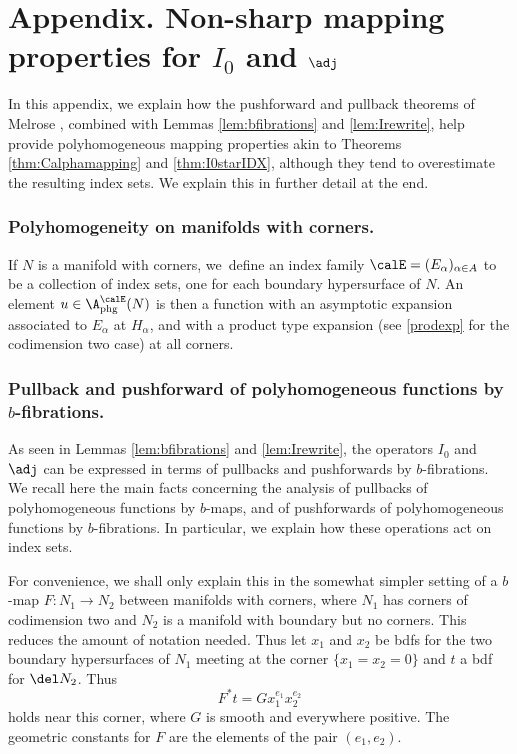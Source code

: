 \appendix

\section*{Appendix. Non-sharp mapping properties for \texorpdfstring{$I_0$ and $\adj$}{adj}}\label{sec:PFT}

In this appendix, we explain how the pushforward and pullback theorems of Melrose \cite{Melrose1992}, combined with Lemmas \ref{lem:bfibrations} and \ref{lem:Irewrite}, help provide polyhomogeneous mapping properties akin to Theorems \ref{thm:Calphamapping} and \ref{thm:I0starIDX}, although they tend to overestimate the resulting index sets. We explain this in further detail at the end.

\subsubsection*{Polyhomogeneity on manifolds with corners.} If $N$ is a manifold with corners, we~defi\-ne an index family $\calE = (E_\alpha)_{\alpha \in A}$ to be a collection of index sets, one for each boundary hypersurface of $N$. An element $u \in \A^{\calE}_{\mathrm{phg}}(N)$ is then a function with an asymptotic expansion associated to $E_\alpha$ at $H_\alpha$, and with a product type expansion (see \eqref{prodexp} for the codimension two case) at all corners.

\subsubsection*{Pullback and pushforward of polyhomogeneous functions by $b$-fibrations.} As seen in Lemmas \ref{lem:bfibrations} and \ref{lem:Irewrite}, the operators $I_0$ and $\adj$ can be expressed in terms of pullbacks and pushforwards by $b$-fibrations. We recall here the main facts concerning the analysis of pullbacks of polyhomogeneous functions by $b$-maps, and of pushforwards of polyhomogeneous functions by $b$-fibrations. In particular, we explain how these operations act on index sets.

For convenience, we shall only explain this in the somewhat simpler setting of a $b$-map $F\colon N_1 \to N_2$ between manifolds with corners, where $N_1$ has corners of codimension two and $N_2$ is a manifold with boundary but no corners. This reduces the amount of notation needed. Thus let $x_1$ and $x_2$ be bdfs for the two boundary hypersurfaces of $N_1$ meeting at the corner $\{x_1 = x_2 = 0\}$ and $t$ a bdf for $\del N_2$. Thus
\[
F^* t = G x_1^{e_1} x_2^{e_2}
\]
holds near this corner, where $G$ is smooth and everywhere positive. The geometric constants for $F$ are the elements of the pair $(e_1, e_2)$.

